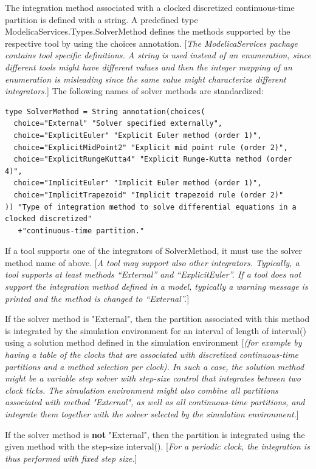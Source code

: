\documentclass[10pt,a4paper]{report}
\begin{document}
The integration method associated with a clocked discretized
continuous-time partition is defined with a string. A predefined type
ModelicaServices.Types.SolverMethod defines the methods supported by the
respective tool by using the choices annotation. {[}\emph{The
ModelicaServices package contains tool specific definitions. A string is
used instead of an enumeration, since different tools might have
different values and then the integer mapping of an enumeration is
misleading since the same value might characterize different
integrators.}{]} The following names of solver methods are standardized:

\begin{lstlisting}[language=modelica]
type SolverMethod = String annotation(choices(
  choice="External" "Solver specified externally",
  choice="ExplicitEuler" "Explicit Euler method (order 1)",
  choice="ExplicitMidPoint2" "Explicit mid point rule (order 2)",
  choice="ExplicitRungeKutta4" "Explicit Runge-Kutta method (order 4)",
  choice="ImplicitEuler" "Implicit Euler method (order 1)",
  choice="ImplicitTrapezoid" "Implicit trapezoid rule (order 2)"
)) "Type of integration method to solve differential equations in a clocked discretized"
   +"continuous-time partition."
\end{lstlisting}

If a tool supports one of the integrators of SolverMethod, it must use
the solver method name of above. {[}\emph{A tool may support also other
integrators. Typically, a tool supports at least methods ``External''
and ``ExplicitEuler''. If a tool does not support the integration method
defined in a model, typically a warning message is printed and the
method is changed to ``External''.}{]}

If the solver method is "External", then the partition associated with
this method is integrated by the simulation environment for an interval
of length of interval() using a solution method defined in the
simulation environment {[}\emph{(for example by having a table of the
clocks that are associated with discretized continuous-time partitions
and a method selection per clock). In such a case, the solution method
might be a variable step solver with step-size control that integrates
between two clock ticks. The simulation environment might also combine
all partitions associated with method "External", as well as all
continuous-time partitions, and integrate them together with the solver
selected by the simulation environment.}{]}

If the solver method is \textbf{not} "External", then the partition is
integrated using the given method with the step-size interval().
{[}\emph{For a periodic clock, the integration is thus performed with
fixed step size.}{]}
\end{document}
